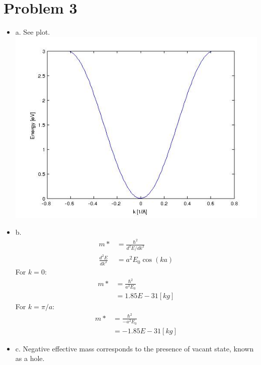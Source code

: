 \documentclass{article}
\numberwithin{equation}{section}
\begin{document}
\section*{Problem 3}
\begin{itemize}
\item a. See plot. \includegraphics[scale=0.5]{A8q3.jpg}
\item b.
\begin{align*}
	m* &= \frac{\hbar^2}{d^2E/dk^2}\\
        \frac{d^2E}{dk^2}&=a^2E_0\cos(ka)
\end{align*}
For $k=0$:
\begin{align*}
	m* &= \frac{\hbar^2}{a^2E_0}\\
           & =1.85E-31 [kg]
\end{align*}
For $k=\pi/a$:
\begin{align*}
	m* &= \frac{\hbar^2}{-a^2E_0}\\
           & =-1.85E-31 [kg]
\end{align*}
\item c. Negative effective mass corresponds to the presence of vacant state, known as a hole.
\end{itemize}
\end{document}
